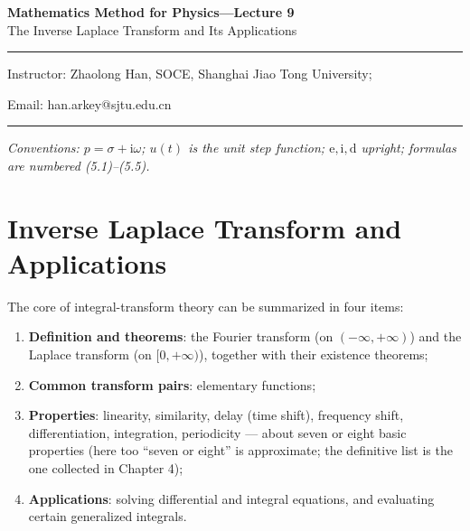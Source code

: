 \documentclass[11pt,a4paper]{article}
\theoremstyle{definition}
\theoremstyle{plain}
\begin{document}
\begin{center}
    {\LARGE \textbf{Mathematics Method for Physics---Lecture 9}} \\[0.6em]
    {\large The Inverse Laplace Transform and Its Applications}
\end{center}

\vspace{-0.5em}
\noindent\rule{\textwidth}{0.5pt}
\vspace{0.3em}

\begin{center}
    Instructor: Zhaolong Han, SOCE, Shanghai Jiao Tong University;
\end{center}

\vspace{-0.6em}
\noindent Email: han.arkey@sjtu.edu.cn

\vspace{0.4em}
\noindent\rule{\textwidth}{0.5pt}

\vspace{0.8em}
\noindent\textit{Conventions: $p=\sigma+\mathrm{i}\omega$; $u(t)$ is the unit step function;
$\mathrm{e},\mathrm{i},\mathrm{d}$ upright; formulas are numbered (5.1)--(5.5).}

\vspace{0.8em}

\setcounter{section}{4}

\section{Inverse Laplace Transform and Applications}

The core of integral-transform theory can be summarized in four items:
\begin{enumerate}[itemsep=2pt,topsep=3pt]
    \item \textbf{Definition and theorems}: the Fourier transform (on $(-\infty,+\infty)$) and the
          Laplace transform (on $[0,+\infty)$), together with their existence theorems;
    \item \textbf{Common transform pairs}: elementary functions;
    \item \textbf{Properties}: linearity, similarity, delay (time shift), frequency shift,
          differentiation, integration, periodicity --- about seven or eight basic properties
          (here too ``seven or eight'' is approximate; the definitive list is the one collected in
          Chapter 4);
    \item \textbf{Applications}: solving differential and integral equations, and evaluating
          certain generalized integrals.
\end{enumerate}
\end{document}
